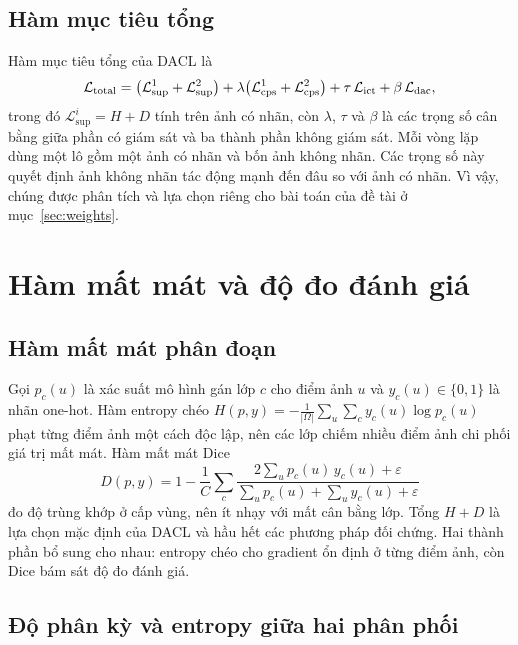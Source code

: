 \subsection{Hàm mục tiêu tổng}

Hàm mục tiêu tổng của DACL là
\begin{equation}
  \mathcal{L}_{\mathrm{total}}=\big(\mathcal{L}^1_{\mathrm{sup}}+\mathcal{L}^2_{\mathrm{sup}}\big)
  +\lambda\big(\mathcal{L}^1_{\mathrm{cps}}+\mathcal{L}^2_{\mathrm{cps}}\big)
  +\tau\,\mathcal{L}_{\mathrm{ict}}+\beta\,\mathcal{L}_{\mathrm{dac}} ,
  \label{eq:total}
\end{equation}
trong đó $\mathcal{L}^i_{\mathrm{sup}}=H+D$ tính trên ảnh có nhãn, còn $\lambda$, $\tau$ và $\beta$ là các trọng số cân bằng giữa phần có giám sát và ba thành phần không giám sát. Mỗi vòng lặp dùng một lô gồm một ảnh có nhãn và bốn ảnh không nhãn. Các trọng số này quyết định ảnh không nhãn tác động mạnh đến đâu so với ảnh có nhãn. Vì vậy, chúng được phân tích và lựa chọn riêng cho bài toán của đề tài ở mục~\ref{sec:weights}.

\section{Hàm mất mát và độ đo đánh giá}
\label{sec:metrics}

\subsection{Hàm mất mát phân đoạn}

Gọi $p_c(u)$ là xác suất mô hình gán lớp $c$ cho điểm ảnh $u$ và $y_c(u)\in\{0,1\}$ là nhãn one-hot. Hàm entropy chéo
$H(p,y)=-\frac{1}{|\Omega|}\sum_{u}\sum_{c} y_c(u)\log p_c(u)$
phạt từng điểm ảnh một cách độc lập, nên các lớp chiếm nhiều điểm ảnh chi phối giá trị mất mát. Hàm mất mát Dice~\cite{milletari2016vnet}
\begin{equation}
  D(p,y)=1-\frac{1}{C}\sum_{c}\frac{2\sum_u p_c(u)\,y_c(u)+\varepsilon}{\sum_u p_c(u)+\sum_u y_c(u)+\varepsilon}
\end{equation}
đo độ trùng khớp ở cấp vùng, nên ít nhạy với mất cân bằng lớp. Tổng $H+D$ là lựa chọn mặc định của DACL và hầu hết các phương pháp đối chứng. Hai thành phần bổ sung cho nhau: entropy chéo cho gradient ổn định ở từng điểm ảnh, còn Dice bám sát độ đo đánh giá.

\subsection{Độ phân kỳ và entropy giữa hai phân phối}

